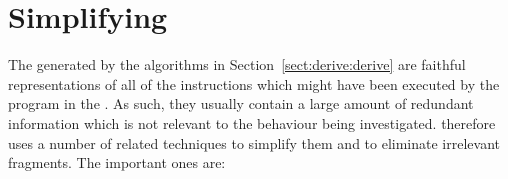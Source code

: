
\section{Simplifying {\StateMachines}}

The {\StateMachines} generated by the algorithms in
Section~\ref{sect:derive:derive} are faithful representations of all
of the instructions which might have been executed by the program in
the .  As such, they usually contain a large
amount of redundant information which is not relevant to the behaviour
being investigated.  {\Technique} therefore uses a number of related
techniques to simplify them and to eliminate irrelevant fragments.
The important ones are:

